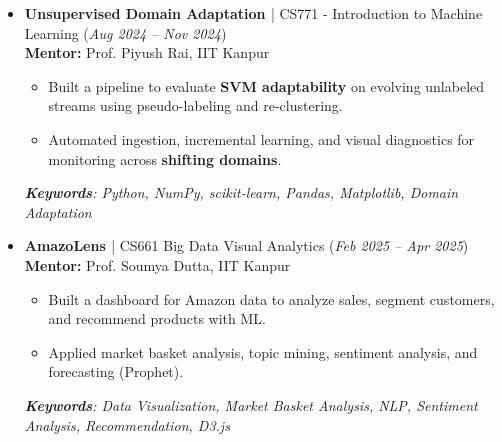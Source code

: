 \documentclass[10pt]{extarticle}
\newcommand{\driveicon}[1]{\href{#1}{\faGoogleDrive}}
\newcommand{\ghicon}[1]{\href{#1}{\faGithub}}
\begin{document}
\begin{itemize}[itemsep=4pt]
    \item \textbf{Unsupervised Domain Adaptation \ghicon{https://github.com/YuvrajRaghuvanshiS/Unsupervised-Domain-Adaptation}} | CS771 - Introduction to Machine Learning \hfill (\textit{Aug 2024 -- Nov 2024}) \\
    \textbf{Mentor:} Prof. Piyush Rai, IIT Kanpur
    \begin{itemize}[left=10pt]
        \item Built a pipeline to evaluate \textbf{SVM adaptability} on evolving unlabeled streams using pseudo-labeling and re-clustering.
        \item Automated ingestion, incremental learning, and visual diagnostics for monitoring across \textbf{shifting domains}.
    \end{itemize}
    \textit{\textbf{Keywords}: Python, NumPy, scikit-learn, Pandas, Matplotlib, Domain Adaptation}

    \item \textbf{AmazoLens \driveicon{https://github.com/YuvrajRaghuvanshiS/resume/raw/refs/heads/master/documents/cs661_proj_report.pdf}} | CS661 Big Data Visual Analytics \hfill (\textit{Feb 2025 -- Apr 2025}) \\
    \textbf{Mentor:} Prof. Soumya Dutta, IIT Kanpur
    \begin{itemize}[left=10pt]
        \item Built a dashboard for Amazon data to analyze sales, segment customers, and recommend products with ML.
        \item Applied market basket analysis, topic mining, sentiment analysis, and forecasting (Prophet).
    \end{itemize}
    \textit{\textbf{Keywords}: Data Visualization, Market Basket Analysis, NLP, Sentiment Analysis, Recommendation, D3.js}

\end{itemize}
\vspace{-10pt}
\end{document}
